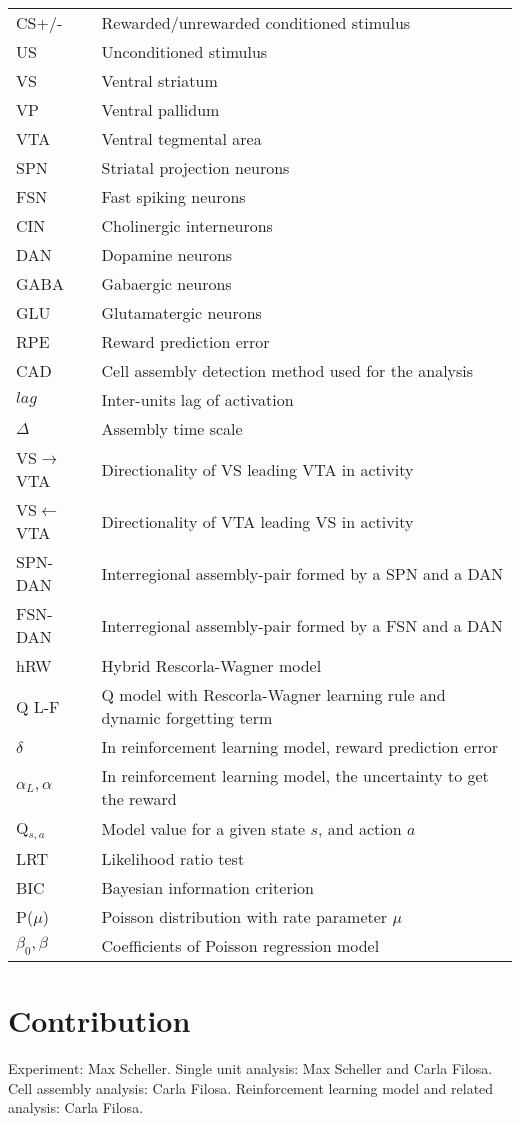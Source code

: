 \begin{tabular}{l l}
CS+/- &{Rewarded/unrewarded conditioned stimulus}\\
US &{Unconditioned stimulus}\\
VS &{Ventral striatum}\\
VP &{Ventral pallidum}\\
VTA &{Ventral tegmental area}\\
SPN &{Striatal projection neurons}\\
FSN &{Fast spiking neurons}\\
CIN &{Cholinergic interneurons}\\
DAN &{Dopamine neurons}\\
GABA &{Gabaergic neurons}\\
GLU &{Glutamatergic neurons}\\
RPE &{Reward prediction error}\\
CAD &{Cell assembly detection method used for the analysis}\\
$lag$ &{Inter-units lag of activation}\\
$\Delta$ &{Assembly time scale}\\
VS$\rightarrow$VTA &{Directionality of VS leading VTA in activity}\\
VS$\leftarrow$VTA &{Directionality of VTA leading VS in activity}\\
SPN-DAN &{Interregional assembly-pair formed by a SPN and a DAN}\\
FSN-DAN &{Interregional assembly-pair formed by a FSN and a DAN}\\
hRW &{Hybrid Rescorla-Wagner model}\\
Q L-F &{Q model with Rescorla-Wagner learning rule and dynamic forgetting term}\\
$\delta$ &{In reinforcement learning model, reward prediction error}\\
$\alpha_L,\alpha$ &{In reinforcement learning model, the uncertainty to get the reward}\\
Q$_{s,a}$ &{Model value for a given state $s$, and action $a$}\\
LRT &{Likelihood ratio test}\\
BIC &{Bayesian information criterion}\\
P($\mu$) &{Poisson distribution with rate parameter $\mu$}\\
$\beta_0,\beta$ &{Coefficients of Poisson regression model}\\
\end{tabular}
\pagebreak
\section*{Contribution}
Experiment: Max Scheller. Single unit analysis: Max Scheller and Carla Filosa. Cell assembly analysis: Carla Filosa. Reinforcement learning model and related analysis: Carla Filosa.